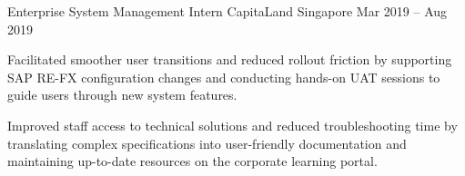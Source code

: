 \begin{cventries}
  \cventry
  {Enterprise System Management Intern} %
  {CapitaLand} %
  {Singapore} %
  {Mar 2019 – Aug 2019} %
  {
    \begin{cvitems} %
      \item {Facilitated smoother user transitions and reduced rollout friction by supporting SAP RE-FX configuration changes and conducting hands-on UAT sessions to guide users through new system features.}
      \item {Improved staff access to technical solutions and reduced troubleshooting time by translating complex specifications into user-friendly documentation and maintaining up-to-date resources on the corporate learning portal.}
      \vspace{3mm}
    \end{cvitems}
  }

\end{cventries}
